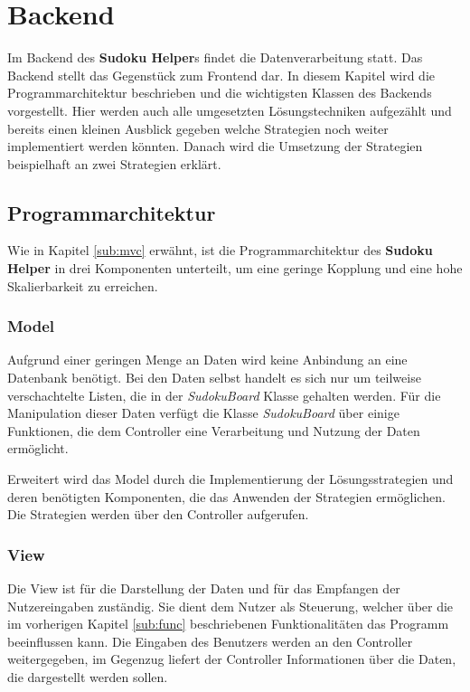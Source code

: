 
\chapter{Backend}

Im Backend des \textbf{Sudoku Helper}s findet die Datenverarbeitung statt. Das Backend stellt das Gegenstück zum Frontend dar. In diesem Kapitel wird die Programmarchitektur beschrieben und die wichtigsten Klassen des Backends vorgestellt. Hier werden auch alle umgesetzten Lösungstechniken aufgezählt und bereits einen kleinen Ausblick gegeben welche Strategien noch weiter implementiert werden könnten. Danach wird die Umsetzung der Strategien beispielhaft an zwei Strategien erklärt.


\section{Programmarchitektur}

Wie in Kapitel \ref{sub:mvc} erwähnt, ist die Programmarchitektur des \textbf{Sudoku Helper} in drei Komponenten unterteilt, um eine geringe Kopplung und eine hohe Skalierbarkeit zu erreichen. 

\subsection{Model}
Aufgrund einer geringen Menge an Daten wird keine Anbindung an eine Datenbank benötigt. Bei den Daten selbst handelt es sich nur um teilweise verschachtelte Listen, die in der \textit{SudokuBoard} Klasse gehalten werden. Für die Manipulation dieser Daten verfügt die Klasse \textit{SudokuBoard} über einige Funktionen, die dem Controller eine Verarbeitung und Nutzung der Daten ermöglicht.

Erweitert wird das Model durch die Implementierung der Lösungsstrategien und deren benötigten Komponenten, die das Anwenden der Strategien ermöglichen. Die Strategien werden über den Controller aufgerufen.

\subsection{View}
Die View ist für die Darstellung der Daten und für das Empfangen der Nutzereingaben zuständig. Sie dient dem Nutzer als Steuerung, welcher über die im vorherigen Kapitel \ref{sub:func} beschriebenen Funktionalitäten das Programm beeinflussen kann. Die Eingaben des Benutzers werden an den Controller weitergegeben, im Gegenzug liefert der Controller Informationen über die Daten, die dargestellt werden sollen. 

